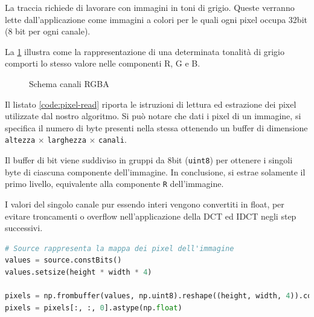 \documentclass[11pt,italian]{article}
\begin{document}
La traccia richiede di lavorare con immagini in toni di grigio. Queste verranno lette dall'applicazione come immagini a colori per le quali ogni pixel occupa 32bit (8 bit per ogni canale).

La \cref{fig:channels} illustra come la rappresentazione di una determinata tonalità di grigio comporti lo stesso valore nelle componenti R, G e B.
\begin{figure}[H]
    \caption{Schema canali RGBA}
    \label{fig:channels}
\end{figure}

\noindent
Il listato \ref{code:pixel-read} riporta le istruzioni di lettura ed estrazione dei pixel utilizzate dal nostro algoritmo.
Si può notare che dati i pixel di un immagine, si specifica il numero di byte presenti nella stessa ottenendo un buffer di dimensione \lstinline{altezza} $\times$ \lstinline{larghezza} $\times$ \lstinline{canali}.

Il buffer di bit viene suddiviso in gruppi da 8bit (\lstinline{uint8}) per ottenere i singoli byte di ciascuna componente dell'immagine. In conclusione, si estrae solamente il primo livello, equivalente alla componente \lstinline{R} dell'immagine.

I valori del singolo canale pur essendo interi vengono convertiti in float, per evitare troncamenti o overflow nell'applicazione della DCT ed IDCT negli step successivi.

\begin{lstlisting}[language=Python,label=code:pixel-read,caption=Estrazione del canale R dall'immagine]
# Source rappresenta la mappa dei pixel dell'immagine
values = source.constBits()
values.setsize(height * width * 4)

pixels = np.frombuffer(values, np.uint8).reshape((height, width, 4)).copy()
pixels = pixels[:, :, 0].astype(np.float)
\end{lstlisting}
\end{document}

